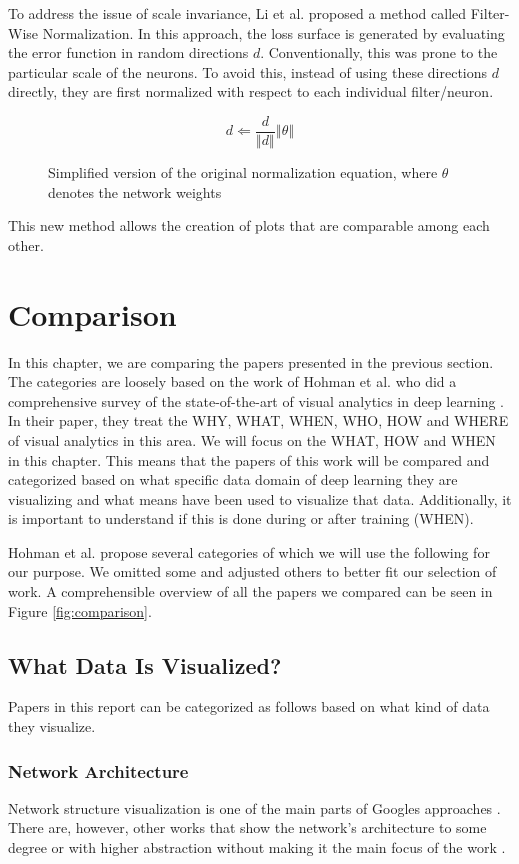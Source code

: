\documentclass{acmsiggraph}               %
\begin{document}
To address the issue of scale invariance, Li et al. proposed a method called Filter-Wise Normalization. In this approach, the loss surface is generated by evaluating the error function in random directions $d$. Conventionally, this was prone to the particular scale of the neurons. To avoid this, instead of using these directions $d$ directly, they are first normalized with respect to each individual filter/neuron.

\begin{figure}
\begin{equation}
  d \Leftarrow \frac{d}{\left\Vert d \right\Vert} \left\Vert\theta\right\Vert
\end{equation}
\caption{Simplified version of the original normalization equation, where $\theta$ denotes the network weights \protect\cite{Li2017}}
\end{figure}

This new method allows the creation of plots that are comparable among each other.

\section{Comparison}
In this chapter, we are comparing the papers presented in the previous section. 
The categories are loosely based on the work of Hohman et al. who did a comprehensive survey of the state-of-the-art of visual analytics in deep learning \cite{Hohman2018}.
In their paper, they treat the WHY, WHAT, WHEN, WHO, HOW and WHERE of visual analytics in this area.
We will focus on the WHAT, HOW and WHEN in this chapter. This means that the papers of this work will be compared and categorized based on what specific data domain of deep learning they are visualizing and what means have been used to visualize that data. Additionally, it is important to understand if this is done during or after training (WHEN).

Hohman et al. propose several categories of which we will use the following for our purpose. We omitted some and adjusted others to better fit our selection of work. A comprehensible overview of all the papers we compared can be seen in Figure \ref{fig:comparison}.

\subsection{What Data Is Visualized?}
Papers in this report can be categorized as follows based on what kind of data they visualize.
\subsubsection{Network Architecture}
Network structure visualization is one of the main parts of Googles approaches \cite{Wongsuphasawat2018,Smilkov2017}.
There are, however, other works that show the network's architecture to some degree or with higher abstraction without making it the main focus of the work \cite{Liu2016,Liu2018}.
\end{document}

